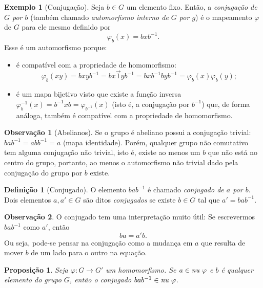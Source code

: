 \documentclass[a4paper,12pt]{report}
\newcommand{\nucleoe}{\emph{\text{nu }}}
\theoremstyle{plain}
\newtheorem{proposicao}{Proposição}[section]
\theoremstyle{definition}
\newtheorem{definicao}{Definição}[section]
\newtheorem{observacao}{Observação}[section]
\newtheorem{exemplo}{Exemplo}[section]
\begin{document}
	\begin{exemplo}[Conjugação]
		 Seja \(b\in G\) um elemento fixo. Então, a
		\emph{conjugação de \(G\) por \(b\)} (também chamado \emph{automorfismo interno de $G$ por $g$}) é o mapeamento \(\varphi\) de \(G\)
		para ele mesmo definido por
		\[\varphi_b(x) = bxb^{-1}.\]
		Esse é um automorfismo porque:
		\begin{itemize}
			\item é compatível com a propriedade de homomorfismo: \[\varphi_b(xy) = bxyb^{-1} = bx\vec{1}yb^{-1} = bxb^{-1}byb^{-1} = \varphi_b(x)\varphi_b(y);\]
			\item é um mapa bijetivo visto que existe a função inversa $\varphi_b^{-1}(x) = b^{-1}xb = \varphi_{b^{-1}}(x)$ (isto é, a conjugação por \(b^{-1}\)) que, de forma análoga, também é compatível com a propriedade de homomorfismo.
		\end{itemize}
	\end{exemplo}
	
	\begin{observacao}[Abelianos]\label{ob:conjugadosDeAbelianos}
		Se o grupo é abeliano possui a conjugação trivial:
		\(bab^{ -1} = abb^{-1} = a\) (mapa identidade). Porém, qualquer grupo não comutativo tem alguma conjugação não trivial, isto é, existe ao menos um $b$ que não está no centro do grupo, portanto, ao menos o automorfismo não trivial dado pela conjugação do grupo por $b$ existe. 
	\end{observacao}
	
	\begin{definicao}[Conjugado]
		O elemento \(bab^{-1}\) é chamado \emph{conjugado de \(a\) por \(b\)}. Dois elementos \(a, a'\in G\) são ditos \emph{conjugados} se existe \(b\in G\) tal que \(a' = bab^{-1}\).	
	\end{definicao}
	
	\begin{observacao}
		O conjugado tem uma interpretação muito útil: Se escrevermos
		\(bab^{-1}\) como \(a'\), então \[ba = a'b.\] Ou seja, pode-se pensar na
		conjugação como a mudança em \(a\) que resulta de mover \(b\) de um lado
		para o outro na equação.
	\end{observacao}		
	
	
	\begin{proposicao}
		Seja $\varphi: G \longrightarrow G'$ um homomorfismo. Se \(a\in \nucleoe\varphi\) e \(b\) é qualquer elemento do grupo \(G\), então o conjugado \(bab^{-1} \in \nucleoe\varphi\).
	\end{proposicao}
	
\end{document}
